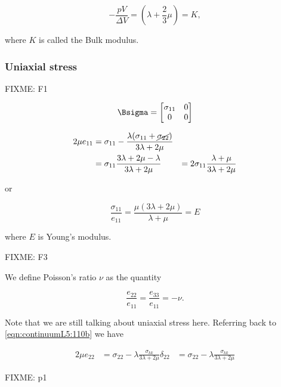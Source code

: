 \begin{equation}\label{eqn:continuumL5:n}
- \frac{ p V}{\Delta V} = \left( \lambda + \frac{2}{3} \mu \right) = K,
\end{equation}

where $K$ is called the Bulk modulus.

\subsubsection{Uniaxial stress}

FIXME: F1

\begin{equation}\label{eqn:continuumL5:n}
\Bsigma = 
\begin{bmatrix}
\sigma_{11} & 0 \\
0 & 0
\end{bmatrix}
\end{equation}

\begin{align*}
2 \mu e_{11} 
&= \sigma_{11} - \frac{\lambda ( \sigma_{11} + \cancel{\sigma_{22}} ) }{3 \lambda + 2 \mu} \\
&= \sigma_{11} \frac{3 \lambda + 2 \mu - \lambda }{3 \lambda + 2 \mu}
&= 2 \sigma_{11} \frac{\lambda + \mu }{3 \lambda + 2 \mu}
\end{align*}

or

\begin{equation}\label{eqn:continuumL5:n}
\frac{\sigma_{11}}{e_{11}} = \frac{\mu(3 \lambda + 2 \mu)}{\lambda + \mu } = E
\end{equation}

where $E$ is Young's modulus.

FIXME: F3

We define Poisson's ratio $\nu$ as the quantity

\begin{equation}\label{eqn:continuumL5:n}
\frac{e_{22}}{e_{11}} = \frac{e_{33}}{e_{11}} = - \nu.
\end{equation}

Note that we are still talking about uniaxial stress here.  Referring back to \ref{eqn:continuumL5:110b} we have

\begin{align*}
2 \mu e_{2 2} 
&= \sigma_{2 2} - \lambda \frac{\sigma_{k k}}{3 \lambda + 2 \mu} \delta_{2 2}
&= \sigma_{2 2} - \lambda \frac{\sigma_{k k}}{3 \lambda + 2 \mu} 
\end{align*}

FIXME: p1

\EndArticle

